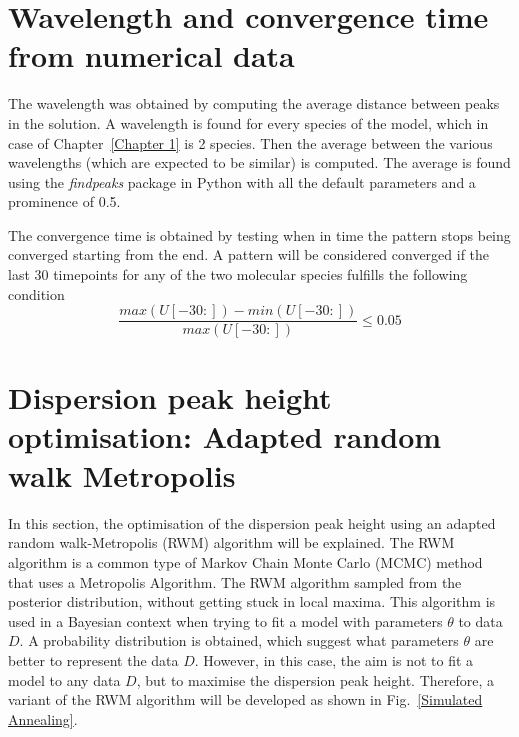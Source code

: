 \section{Wavelength and convergence time from numerical data}\label{Wavelength and convergence time from numerical data}
The wavelength was obtained by computing the average distance between peaks in the solution.
A wavelength is found for every species of the model, which in case of Chapter~\ref{Chapter 1} is 2 species.
Then the average between the various wavelengths (which are expected to be similar) is computed.
The average is found using the \textit{findpeaks} package in Python with all the default parameters and a prominence of 0.5.

The convergence time is obtained by testing when in time the pattern stops being converged starting from the end.
A pattern will be considered converged if the last 30 timepoints for any of the two molecular species fulfills the following condition
\begin{equation}
    \frac{max(U[-30:]) - min(U[-30:])}{max(U[-30:])} \leq 0.05
\end{equation}

\section{Dispersion peak height optimisation: Adapted random walk Metropolis}\label{dispersion_peak_optimisation}
In this section, the optimisation of the dispersion peak height using an adapted random walk-Metropolis (RWM) algorithm will be explained.
The RWM algorithm is a common type of Markov Chain Monte Carlo (MCMC) method that uses a Metropolis Algorithm.
The RWM algorithm sampled from the posterior distribution, without getting stuck in local maxima.
This algorithm is used in a Bayesian context when trying to fit a model with parameters $\theta$ to data $D$.
A probability distribution is obtained, which suggest what parameters $\theta$ are better to represent the data $D$.
However, in this case, the aim is not to fit a model to any data $D$, but to maximise the dispersion peak height.
Therefore, a variant of the RWM algorithm will be developed as shown in Fig.~\ref{Simulated Annealing}.

